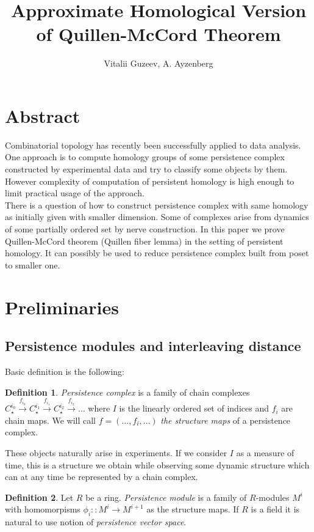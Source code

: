 \documentclass[a4paper, 12pt]{article}
\title{Approximate Homological Version of Quillen-McCord Theorem}
\author{Vitalii Guzeev, A. Ayzenberg}
\theoremstyle{definition}
\newtheorem{definition}{Definition}
\theoremstyle{remark}
\newcommand{\define}[1]{{\textit{#1}}}
\begin{document}
\section{Abstract}

Combinatorial topology has recently been successfully applied to data analysis. One approach is to compute homology groups of some persistence complex constructed by experimental data and try to classify some objects by them. However complexity of computation of persistent homology is high enough to limit practical usage of the approach.\\

There is a question of how to construct persistence complex with same homology as initially given with smaller dimension. Some of complexes arise from dynamics of some partially ordered set by nerve construction. In this paper we prove Quillen-McCord theorem (Quillen fiber lemma) in the setting of persistent homology. It can possibly be used to reduce persistence complex built from poset to smaller one.

\section{Preliminaries}

\subsection{Persistence modules and interleaving distance}

Basic definition is the following:

\begin{definition}
  \define{Persistence complex} is a family of chain complexes $C_{\star}^{i_0} \xrightarrow{f_{i_0}} C_{\star}^{i_1} \xrightarrow{f_{i_1}} C_{\star}^{i_2} \xrightarrow{f_{i_2}} \ldots$ where $I$ is the linearly ordered set of indices and $f_i$ are chain maps. We will call $f=(\ldots,f_i,\ldots)$ \define{the structure maps} of a persistence complex.
\end{definition}

These objects naturally arise in experiments. If we consider $I$ as a measure of time, this is a structure we obtain while observing some dynamic structure which can at any time be represented by a chain complex.\\

\begin{definition}
  Let $R$ be a ring. \define{Persistence module} is a family of $R$-modules $M^i$ with homomorpisms $\phi_i :: M^i \to M^{i+1}$ as the structure maps. If $R$ is a field it is natural to use notion of \define{persistence vector space}.
\end{definition}
\end{document}
